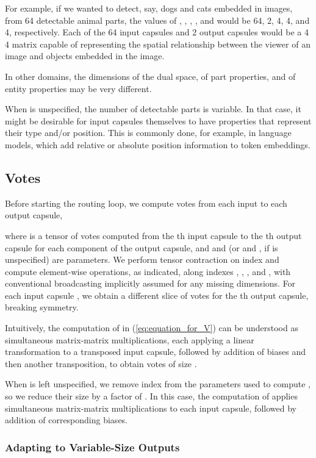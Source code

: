 \documentclass[11pt,a4paper]{article}
\begin{document}
For example, if we wanted to detect, say, dogs and cats embedded in images, from 64 detectable animal parts, the values of , , , , and  would be 64, 2, 4, 4, and 4, respectively. Each of the 64 input capsules and 2 output capsules would be a 4  4 matrix capable of representing the spatial relationship between the viewer of an image and objects embedded in the image.

In other domains, the dimensions  of the dual space,  of part properties, and  of entity properties may be very different.

When  is unspecified, the number of detectable parts is variable. In that case, it might be desirable for input capsules themselves to have properties that represent their type and/or position. This is commonly done, for example, in language models, which add relative or absolute position information to token embeddings.

\subsection{Votes}\label{ssec:Computation-of-Votes}

Before starting the routing loop, we compute votes from each input to each output capsule,



where  is a tensor of votes computed from the th input capsule to the th output capsule for each component  of the output capsule, and  and  (or  and , if  is unspecified) are parameters. We perform tensor contraction on index  and compute element-wise operations, as indicated, along indexes , , , and , with conventional broadcasting implicitly assumed for any missing dimensions. For each input capsule , we obtain a different  slice of votes for the th output capsule, breaking symmetry.

Intuitively, the computation of  in (\ref{eq:equation_for_V}) can be understood as  simultaneous matrix-matrix multiplications, each applying a  linear transformation to a  transposed input capsule, followed by addition of biases and then another transposition, to obtain  votes of size .

When  is left unspecified, we remove index  from the parameters used to compute , so we reduce their size by a factor of . In this case, the computation of  applies  simultaneous matrix-matrix multiplications to each input capsule, followed by addition of  corresponding  biases.

\subsubsection{Adapting to Variable-Size Outputs}
\label{sssec:handling_variable_size_outputs}
\end{document}
